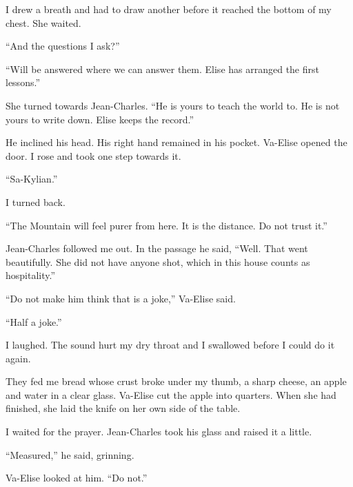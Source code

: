 I drew a breath and had to draw another before it reached the bottom of my chest. She waited.\par

``And the questions I ask?''\par

``Will be answered where we can answer them. Elise has arranged the first lessons.''\par

She turned towards Jean-Charles. ``He is yours to teach the world to. He is not yours to write down. Elise keeps the record.''\par

He inclined his head. His right hand remained in his pocket. Va-Elise opened the door. I rose and took one step towards it.\par

``Sa-Kylian.''\par

I turned back.\par

``The Mountain will feel purer from here. It is the distance. Do not trust it.''\par

Jean-Charles followed me out. In the passage he said, ``Well. That went beautifully. She did not have anyone shot, which in this house counts as hospitality.''\par

``Do not make him think that is a joke,'' Va-Elise said.\par

``Half a joke.''\par

I laughed. The sound hurt my dry throat and I swallowed before I could do it again.\par

\ornament

They fed me bread whose crust broke under my thumb, a sharp cheese, an apple and water in a clear glass. Va-Elise cut the apple into quarters. When she had finished, she laid the knife on her own side of the table.\par

I waited for the prayer. Jean-Charles took his glass and raised it a little.\par

``Measured,'' he said, grinning.\par

Va-Elise looked at him. ``Do not.''\par

